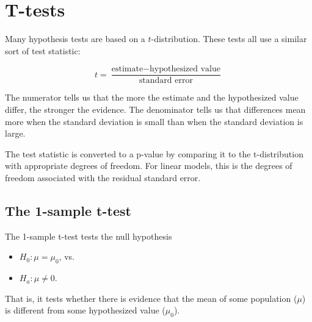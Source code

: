\documentclass[twoside]{book}
\begin{document}
\section{T-tests}

Many hypothesis tests are based on a $t$-distribution.  These tests all use a similar sort
of test statistic:

\[
t = \frac{\mbox{estimate} - \mbox{hypothesized value}}{\mbox{standard error}}
\]

The numerator tells us that the more the estimate and the hypothesized value differ, 
the stronger the evidence.  The denominator tells us that differences mean more when the standard
deviation is small than when the standard deviation is large.

The test statistic is converted to a p-value by comparing it to the t-distribution with appropriate
degrees of freedom.  For linear models, this is the degrees of freedom associated with the 
residual standard error.

\subsection{The 1-sample t-test}
The 1-sample t-test tests the null hypothesis
\begin{itemize}
	\item $H_0: \mu = \mu_0$, vs.
	\item $H_a: \mu \neq 0$.
\end{itemize}
That is, it tests whether there is evidence that the mean of some population ($\mu$) is different
from some hypothesized value ($\mu_0$).
\end{document}
